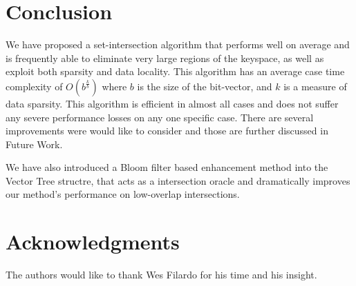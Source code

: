 \documentclass[11pt,letterpaper]{article}
\begin{document}
\section{Conclusion}
We have proposed a set-intersection algorithm that performs well
on average and is frequently able to eliminate very large regions of
the keyspace, as well as exploit both sparsity and data locality.  
This algorithm has an average case time complexity of
$O\left(b^{\frac{k}{b}}\right)$ where $b$ is the size of the bit-vector,
and $k$ is a measure of data sparsity. This algorithm is efficient in almost
all cases and does not suffer any severe performance losses on any one
specific case. There are several improvements were would like to consider
and those are further discussed in Future Work.

We have also introduced a Bloom filter based enhancement method into
the Vector Tree structre, that acts as a intersection oracle and
dramatically improves our method's performance on low-overlap
intersections.


\section*{Acknowledgments}
The authors would like to thank Wes Filardo for his time and his insight.



\end{document}
